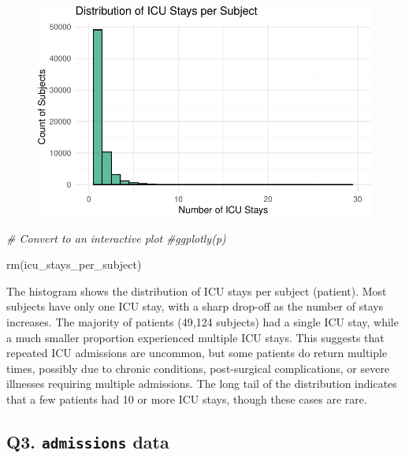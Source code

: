 \documentclass[
]{article}
\newenvironment{Shaded}{\begin{snugshade}}{\end{snugshade}}
\newcommand{\CommentTok}[1]{\textcolor[rgb]{0.56,0.35,0.01}{\textit{#1}}}
\newcommand{\FunctionTok}[1]{\textcolor[rgb]{0.00,0.00,0.00}{#1}}
\newcommand{\NormalTok}[1]{\textcolor[rgb]{0.00,0.00,0.00}{#1}}
\begin{document}
\begin{figure}[H]

{\centering \includegraphics{hw3_files/figure-pdf/unnamed-chunk-20-1.pdf}

}

\end{figure}

\begin{Shaded}
\begin{Highlighting}[]
\CommentTok{\# Convert to an interactive plot}
\CommentTok{\#ggplotly(p)}

\FunctionTok{rm}\NormalTok{(icu\_stays\_per\_subject)}
\end{Highlighting}
\end{Shaded}

The histogram shows the distribution of ICU stays per subject (patient).
Most subjects have only one ICU stay, with a sharp drop-off as the
number of stays increases. The majority of patients (49,124 subjects)
had a single ICU stay, while a much smaller proportion experienced
multiple ICU stays. This suggests that repeated ICU admissions are
uncommon, but some patients do return multiple times, possibly due to
chronic conditions, post-surgical complications, or severe illnesses
requiring multiple admissions. The long tail of the distribution
indicates that a few patients had 10 or more ICU stays, though these
cases are rare.

\hypertarget{q3.-admissions-data}{%
\subsection{\texorpdfstring{Q3. \texttt{admissions}
data}{Q3. admissions data}}\label{q3.-admissions-data}}
\end{document}
